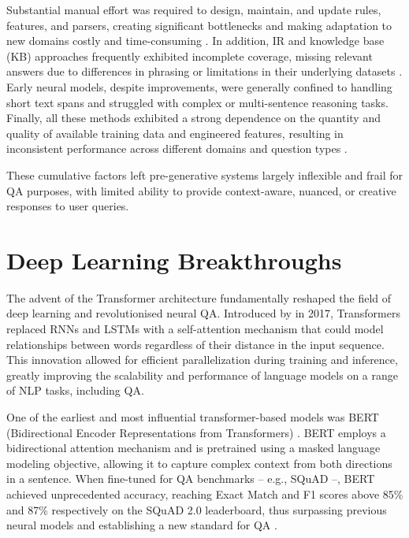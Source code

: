\begin{spacing}{1.5}
Substantial manual effort was required to design, maintain, and update rules, features, and parsers, creating significant bottlenecks and making adaptation to new domains costly and time-consuming \citep{alanazi_question_2021}. In addition, IR and knowledge base (KB) approaches frequently exhibited incomplete coverage, missing relevant answers due to differences in phrasing or limitations in their underlying datasets \citep{diefenbach_core_2018}. Early neural models, despite improvements, were generally confined to handling short text spans and struggled with complex or multi-sentence reasoning tasks. Finally, all these methods exhibited a strong dependence on the quantity and quality of available training data and engineered features, resulting in inconsistent performance across different domains and question types \citep{liu_challenges_2022,alanazi_question_2021,alqifari_question_2019,diefenbach_core_2018,hirschman_natural_2001}.

These cumulative factors left pre-generative systems largely inflexible and frail for QA purposes, with limited ability to provide context-aware, nuanced, or creative responses to user queries.

\section{Deep Learning Breakthroughs}
The advent of the Transformer architecture fundamentally reshaped the field of deep learning and revolutionised neural QA. Introduced by \citeauthor{vaswani_attention_2017} in 2017, Transformers replaced RNNs and LSTMs with a self-attention mechanism that could model relationships between words regardless of their distance in the input sequence. This innovation allowed for efficient parallelization during training and inference, greatly improving the scalability and performance of language models on a range of NLP tasks, including QA.

One of the earliest and most influential transformer-based models was BERT (Bidirectional Encoder Representations from Transformers) \citep{devlin_bert_2019}. BERT employs a bidirectional attention mechanism and is pretrained using a masked language modeling objective, allowing it to capture complex context from both directions in a sentence. When fine-tuned for QA benchmarks -- e.g., SQuAD --, BERT achieved unprecedented accuracy, reaching Exact Match and F1 scores above 85\% and 87\% respectively on the SQuAD 2.0 leaderboard, thus surpassing previous neural models and establishing a new standard for QA \citep{li_death_2024}.


\end{spacing}
